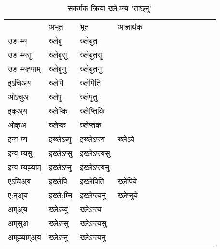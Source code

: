 \begin{table}[H]
\centering
\caption{\label{ep.vt} सकर्मक क्रिया  ख्ले:म्‍न्य  "ताछ्नु"  }
\begin{tabular}{l|l|l|l|l|l|l|l|l|l|l|l|l}  \toprule
&अभूत & भूत & आज्ञार्थक \\ 
उङ म्य &ख्लेबु &ख्लेबुत \\ 
उङ म्यसु &ख्लेबुसु &ख्लेबुतसु \\ 
उङ म्यह्‍याम् &ख्लेबुनु &ख्लेबुतनु \\ 
इऽचिअ्य  &ख्लेपि &ख्लेपिति   \\ 
ओऽचुअ &ख्लेपु &ख्लेपुतु   \\ 
इक्अ्य &ख्लेप्कि &ख्लेप्‍तिकि   \\ 
ओक्अ &ख्लेप्क &ख्लेप्‍तक   \\ 
इन्य म्य& इख्लेऽब्यु  & इख्लेऽप्‍त्य &ख्लेऽबे  \\ 
इन्य म्यसु & इख्लेऽप्सु  & इख्लेऽप्‍त्यसु   \\ 
इन्य म्यह्‍याम् & इख्लेऽप्‍नु  & इख्लेऽप्‍त्यनु   \\ 
एऽचिअ्य & इख्लेपि & इख्लेपिति &ख्लेपिये    \\ 
ए:न्अ्य & इख्ले:म्‍नि  & इख्लेप्‍त्यनु &ख्लेप्‍नुये  \\ 
अम्अ्य & ख्लेऽब्यु  & ख्लेऽप्‍त्य  \\ 
अम्‌सुअ & ख्लेऽप्सु & ख्लेऽप्‍त्यसु  \\ 
अम्‌ह्‍याम्अ्य & ख्लेऽप्‍नु  & ख्लेऽप्‍त्यनु \\ 
\bottomrule
\end{tabular}
\end{table}


